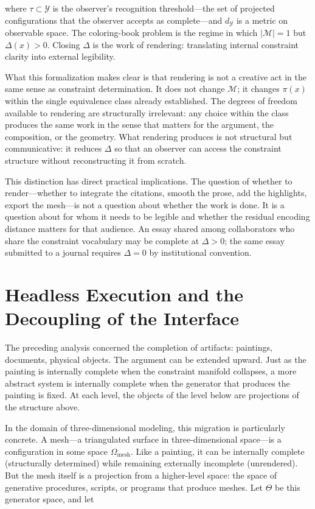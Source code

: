 \documentclass[11pt, twoside]{article}
\theoremstyle{plain}
\theoremstyle{definition}
\theoremstyle{remark}
\begin{document}
where $\tau \subset \mathcal{Y}$ is the observer's recognition threshold---the set of projected configurations that the observer accepts as complete---and $d_{\mathcal{Y}}$ is a metric on observable space. The coloring-book problem is the regime in which $|\mathcal{M}| = 1$ but $\Delta(x) > 0$. Closing $\Delta$ is the work of rendering: translating internal constraint clarity into external legibility.

What this formalization makes clear is that rendering is not a creative act in the same sense as constraint determination. It does not change $\mathcal{M}$; it changes $\pi(x)$ within the single equivalence class already established. The degrees of freedom available to rendering are structurally irrelevant: any choice within the class produces the same work in the sense that matters for the argument, the composition, or the geometry. What rendering produces is not structural but communicative: it reduces $\Delta$ so that an observer can access the constraint structure without reconstructing it from scratch.

This distinction has direct practical implications. The question of whether to render---whether to integrate the citations, smooth the prose, add the highlights, export the mesh---is not a question about whether the work is done. It is a question about for whom it needs to be legible and whether the residual encoding distance matters for that audience. An essay shared among collaborators who share the constraint vocabulary may be complete at $\Delta > 0$; the same essay submitted to a journal requires $\Delta = 0$ by institutional convention.

\section{Headless Execution and the Decoupling of the Interface}
\label{sec:headless}

The preceding analysis concerned the completion of artifacts: paintings, documents, physical objects. The argument can be extended upward. Just as the painting is internally complete when the constraint manifold collapses, a more abstract system is internally complete when the generator that produces the painting is fixed. At each level, the objects of the level below are projections of the structure above.

In the domain of three-dimensional modeling, this migration is particularly concrete. A mesh---a triangulated surface in three-dimensional space---is a configuration in some space $\Omega_{\text{mesh}}$. Like a painting, it can be internally complete (structurally determined) while remaining externally incomplete (unrendered). But the mesh itself is a projection from a higher-level space: the space of generative procedures, scripts, or programs that produce meshes. Let $\Theta$ be this generator space, and let
\end{document}
